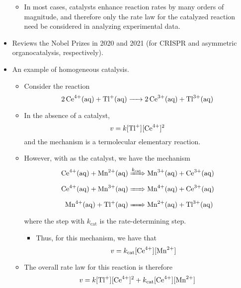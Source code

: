 \documentclass[../notes.tex]{subfiles}
\begin{document}
\begin{itemize}
\begin{itemize}
\begin{equation*}
        \end{equation*}
        \item In most cases, catalysts enhance reaction rates by many orders of magnitude, and therefore only the rate law for the catalyzed reaction need be considered in analyzing experimental data.
    \end{itemize}
    \item Reviews the Nobel Prizes in 2020 and 2021 (for CRISPR and asymmetric organocatalysis, respectively).
    \item An example of homogeneous catalysis.
    \begin{itemize}
        \item Consider the reaction
        \begin{equation*}
            \ce{2Ce^4+(aq) + Tl+(aq) -> 2Ce^3+(aq) + Tl^3+(aq)}
        \end{equation*}
        \item In the absence of a catalyst,
        \begin{equation*}
            v = k\cnc{Tl+}\cnc{Ce^4+}^2
        \end{equation*}
        and the mechanism is a termolecular elementary reaction.
        \item However, with  as the catalyst, we have the mechanism
        \begin{align*}
            \ce{Ce^4+(aq) + Mn^2+(aq)} &\xRightarrow{k_\text{cat}}                \ce{Mn^3+(aq) + Ce^3+(aq)}\\
            \ce{Ce^4+(aq) + Mn^3+(aq)} &\xRightarrow{{\color{white}k_\text{cat}}} \ce{Mn^4+(aq) + Ce^3+(aq)}\\
            \ce{Mn^4+(aq) + Tl+(aq)}   &\xRightarrow{{\color{white}k_\text{cat}}} \ce{Mn^2+(aq) + Tl^3+(aq)}
        \end{align*}
        where the step with $k_\text{cat}$ is the rate-determining step.
        \begin{itemize}
            \item Thus, for this mechanism, we have that
            \begin{equation*}
                v = k_\text{cat}\cnc{Ce^4+}\cnc{Mn^2+}
            \end{equation*}
        \end{itemize}
        \item The overall rate law for this reaction is therefore
        \begin{equation*}
            v = k\cnc{Tl+}\cnc{Ce^4+}^2+k_\text{cat}\cnc{Ce^4+}\cnc{Mn^2+}
        \end{equation*}
    \end{itemize}
\end{itemize}
\end{document}
